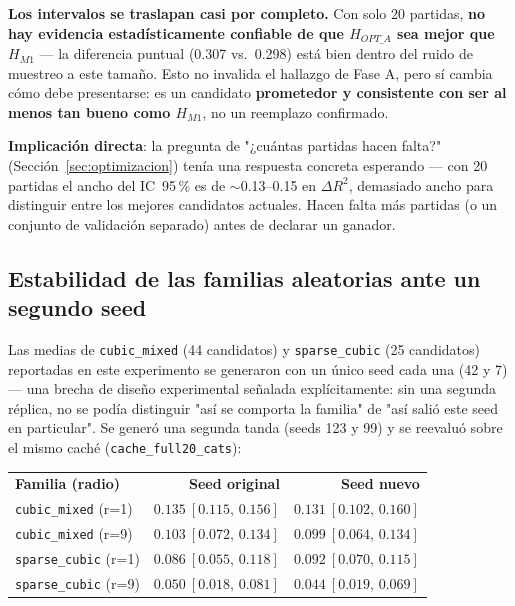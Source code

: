 \documentclass[11pt, a4paper]{article}
\newcommand{\TH}[1]{\cellcolor{cTHbg}\color{white}\textbf{#1}}
\begin{document}
\begin{tcolorbox}[quotebox]
  \textbf{Los intervalos se traslapan casi por completo.} Con solo 20
  partidas, \textbf{no hay evidencia estad\'isticamente confiable de
  que $H_{OPT\_A}$ sea mejor que $H_{M1}$} --- la diferencia puntual
  (0.307 vs.\ 0.298) est\'a bien dentro del ruido de muestreo a este
  tama\~no. Esto no invalida el hallazgo de Fase A, pero s\'i cambia
  c\'omo debe presentarse: es un candidato \textbf{prometedor y
  consistente con ser al menos tan bueno como $H_{M1}$}, no un
  reemplazo confirmado.
\end{tcolorbox}

\textbf{Implicaci\'on directa}: la pregunta de "¿cu\'antas partidas
hacen falta?" (Secci\'on~\ref{sec:optimizacion}) ten\'ia una respuesta
concreta esperando --- con 20 partidas el ancho del IC~95\,\% es de
$\sim$0.13--0.15 en $\Delta R^2$, demasiado ancho para distinguir entre
los mejores candidatos actuales. Hacen falta m\'as partidas (o un
conjunto de validaci\'on separado) antes de declarar un ganador.

\subsection{Estabilidad de las familias aleatorias ante un segundo seed}

Las medias de \texttt{cubic\_mixed} (44 candidatos) y
\texttt{sparse\_cubic} (25 candidatos) reportadas en este experimento
se generaron con un \'unico seed cada una (42 y 7) --- una brecha de
dise\~no experimental se\~nalada expl\'icitamente: sin una segunda
r\'eplica, no se pod\'ia distinguir "as\'i se comporta la familia" de
"as\'i sali\'o este seed en particular". Se gener\'o una segunda
tanda (seeds 123 y 99) y se reevalu\'o sobre el mismo cach\'e
(\texttt{cache\_full20\_cats}):

\medskip
\begin{center}
\begin{tabular}{lrr}
  \TH{Familia (radio)} & \TH{Seed original} & \TH{Seed nuevo} \\[1pt]
  \texttt{cubic\_mixed} (r=1)  & $0.135\ [0.115,\,0.156]$ & $0.131\ [0.102,\,0.160]$ \\
  \texttt{cubic\_mixed} (r=9)  & $0.103\ [0.072,\,0.134]$ & $0.099\ [0.064,\,0.134]$ \\
  \texttt{sparse\_cubic} (r=1) & $0.086\ [0.055,\,0.118]$ & $0.092\ [0.070,\,0.115]$ \\
  \texttt{sparse\_cubic} (r=9) & $0.050\ [0.018,\,0.081]$ & $0.044\ [0.019,\,0.069]$ \\
\end{tabular}
\end{center}
\medskip
\end{document}
